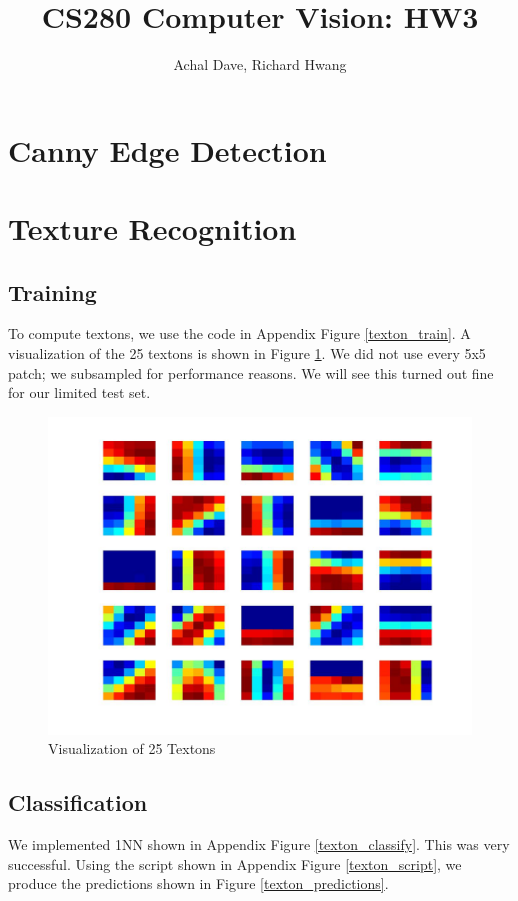 \documentclass[11pt]{article}
\begin{document}
\title{CS280 Computer Vision: HW3}
\author{Achal Dave, Richard Hwang}
\maketitle

\section{Canny Edge Detection}

\section{Texture Recognition}
\subsection{Training}
To compute textons, we use the code in Appendix Figure \ref{texton_train}. A
visualization of the 25 textons is shown in Figure \ref{texton_viz}. We did
not use every 5x5 patch; we subsampled for performance reasons. We will see
this turned out fine for our limited test set.

\begin{figure}[h!]
  \caption{Visualization of 25 Textons}
  \label{texton_viz}
  \centering
    \includegraphics[width=0.6\linewidth]{../textons/textons.jpg}
\end{figure}

\subsection{Classification}
We implemented 1NN shown in Appendix Figure \ref{texton_classify}. This was
very successful. Using the script shown in Appendix Figure \ref{texton_script},
we produce the predictions shown in Figure \ref{texton_predictions}.
\end{document}
